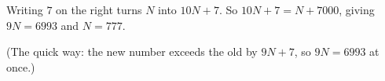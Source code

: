 Writing $7$ on the right turns $N$ into $10N+7$. So $10N+7=N+7000$, giving $9N=6993$ and $N=\boxed{777}$.

(The quick way: the new number exceeds the old by $9N+7$, so $9N=6993$ at once.)
